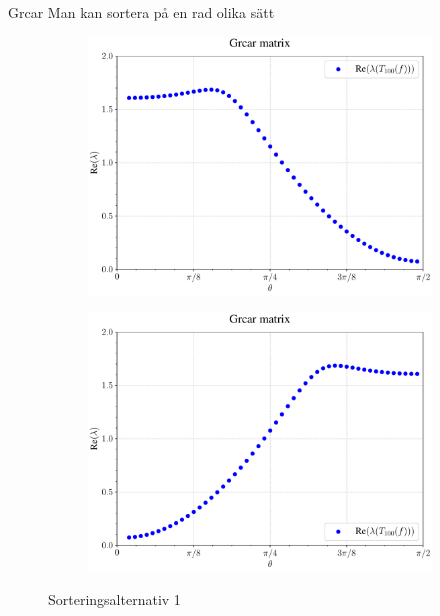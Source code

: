 \documentclass{beamer}
\begin{document}
\begin{frame}{Grcar}
Man kan sortera på en rad olika sätt
    \begin{figure}[H]
    \centering
    \begin{subfigure}{0.49\textwidth}
        \includegraphics[width=\textwidth]{images/Grcar1.pdf}
        \caption{}
        \label{fig:Grcar sort1}
    \end{subfigure}
    \hfill
    \begin{subfigure}{0.49\textwidth}
        \includegraphics[width=\textwidth]{images/Grcar2.pdf}
        \caption{}
        \label{fig:Grcar sort2}
    \end{subfigure}
    \caption{Sorteringsalternativ 1}
    \label{fig:Sorteringsalternativ 1}
    \end{figure}
\end{frame}
\end{document}
